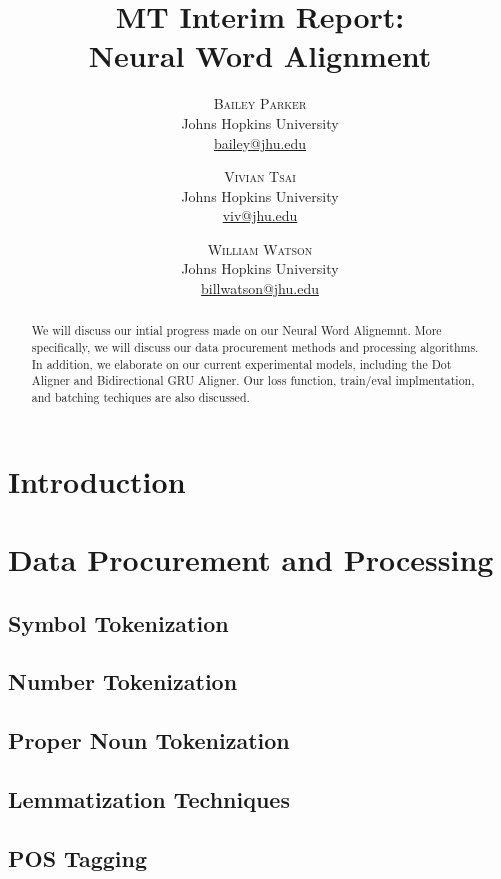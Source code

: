 \documentclass[twoside,twocolumn]{article}
\title{MT Interim Report: \\ Neural Word Alignment}
\author{%
\textsc{Bailey Parker} \\[1ex]
\normalsize Johns Hopkins University \\
\normalsize \href{mailto:bailey@jhu.edu}{bailey@jhu.edu}
 \and
 \textsc{Vivian Tsai} \\[1ex]
\normalsize Johns Hopkins University \\
\normalsize \href{mailto:viv@jhu.edu}{viv@jhu.edu}
 \and
  \textsc{William Watson} \\[1ex]
\normalsize Johns Hopkins University \\
\normalsize \href{mailto:billwatson@jhu.edu}{billwatson@jhu.edu}
}
\date{}
\begin{document}
\maketitle




\begin{abstract}
We will discuss our intial progress made on our Neural Word Alignemnt.
More specifically, we will discuss our data procurement methods and processing
algorithms. In addition, we elaborate on our current experimental models,
including the Dot Aligner and Bidirectional GRU Aligner. Our loss function,
train/eval implmentation, and batching techiques are also discussed.
\end{abstract}

\section{Introduction}

\section{Data Procurement and Processing}
\subsection{Symbol Tokenization}
\subsection{Number Tokenization}
\subsection{Proper Noun Tokenization}
\subsection{Lemmatization Techniques}
\subsection{POS Tagging}
\end{document}
